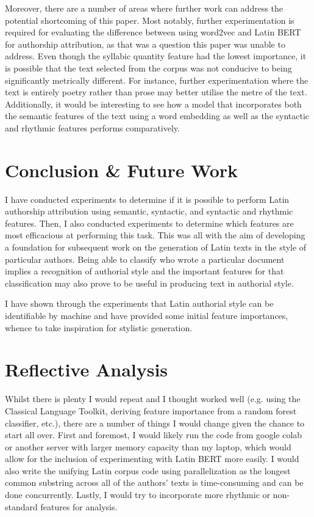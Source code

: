 \documentclass{csfourzero}
\begin{document}
Moreover, there are a number of areas where further work can address the potential shortcoming of this paper. Most notably, further experimentation is required for evaluating the difference between using word2vec and Latin BERT for authorship attribution, as that was a question this paper was unable to address. Even though the syllabic quantity feature had the lowest importance, it is possible that the text selected from the corpus was not conducive to being significantly metrically different.
For instance, further experimentation where the text is entirely poetry rather than prose may better utilise the metre of the text. Additionally, it would be interesting to see how a model that incorporates both the semantic features of the text using a word embedding as well as the syntactic and rhythmic features performs comparatively. 



\section{Conclusion \& Future Work}
\label{sec:conc}

I have conducted experiments to determine if it is possible to perform Latin authorship attribution using semantic, syntactic, and syntactic and rhythmic features. Then, I also conducted experiments to determine which features are most efficacious at performing this task. This was all with the aim of developing a foundation for subsequent work on the generation of Latin texts in the style of particular authors. Being able to classify who wrote a particular document implies a recognition of authorial style and the important features for that classification may also prove to be useful in producing text in authorial style.

I have shown through the experiments that Latin authorial style can be identifiable by machine and have provided some initial feature importances, whence to take inspiration for stylistic generation. 

\section{Reflective Analysis}

Whilst there is plenty I would repeat and I thought worked well (e.g. using the Classical Language Toolkit, deriving feature importance from a random forest classifier, etc.), there are a number of things I would change given the chance to start all over. First and foremost, I would likely run the code from google colab or another server with larger memory capacity than my laptop, which would allow for the inclusion of experimenting with Latin BERT more easily. I would also write the unifying Latin corpus code using parallelization as the longest common substring across all of the authors' texts is time-consuming and can be done concurrently. Lastly, I would try to incorporate more rhythmic or non-standard features for analysis.

\newpage
\nocite{*}

\end{document}
